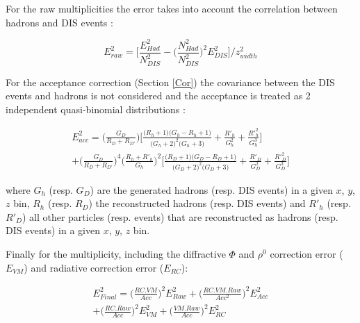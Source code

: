 \documentclass[letterpaper,12pt]{article}
\begin{document}
For the raw multiplicities the error takes into account the correlation between hadrons and DIS events :

\begin{equation}
		E^2_{raw} = \Bigg[\frac{E^2_{Had}}{N^2_{DIS}} - \bigg( \frac{N^2_{Had}}{N^2_{DIS}} \bigg)^2 E^2_{DIS} \Bigg]/z^2_{width}
\end{equation}

For the acceptance correction (Section \ref{Cor}) the covariance between the DIS events and hadrons is not considered and the acceptance is treated as 2 independent quasi-binomial distributions :

\begin{equation}
\begin{split}
		E^2_{acc} = \bigg(\frac{G_D}{R_D+R_{D'}}\bigg) \bigg[ \frac{\big( R_h+1 \big)\big( G_h-R_h+1 \big)}{\big( G_h+2 \big)^2\big( G_h+3 \big)}+\frac{R'_h}{G^2_h}+\frac{R'^2_h}{G^3_h} \bigg] \\
		+ \bigg(\frac{G_D}{R_D+R_{D'}}\bigg)^4 \bigg(\frac{R_h+R'_h}{G_h}\bigg)^2 \bigg[ \frac{\big( R_D+1 \big)\big( G_D-R_D+1 \big)}{\big( G_D+2 \big)^2\big( G_D+3 \big)}+\frac{R'_D}{G^2_D}+\frac{R'^2_D}{G^3_D} \bigg]
\end{split}
\end{equation}

where $G_h$ (resp. $G_D$) are the generated hadrons (resp. DIS events) in a given $x$, $y$, $z$ bin, $R_h$ (resp. $R_D$) the reconstructed hadrons (resp. DIS events) and $R'_h$ (resp. $R'_D$) all other particles (resp. events) that are reconstructed as hadrons (resp. DIS events) in a given $x$, $y$, $z$ bin.

Finally for the multiplicity, including the diffractive $\Phi$ and $\rho^0$ correction error ($E_{VM}$) and radiative correction error ($E_{RC}$):

\begin{equation}
\begin{split}
		E^2_{Final} = \bigg( \frac{RC.VM}{Acc} \bigg)^2 E^2_{Raw} + \bigg(\frac{RC.VM.Raw}{Acc^2} \bigg)^2 E^2_{Acc} \\
		+ \bigg(\frac{RC.Raw}{Acc} \bigg)^2 E^2_{VM} + \bigg(\frac{VM.Raw}{Acc} \bigg)^2 E^2_{RC}
\end{split}
\end{equation}

\end{document}
